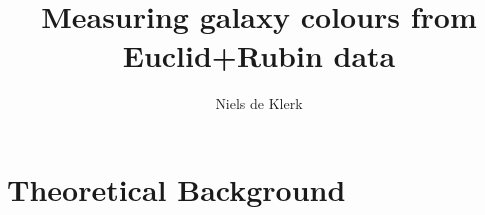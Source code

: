 \documentclass[oneside, single, authoryear, semicolon, 12pt]{lion-msc}
\title{Measuring galaxy colours from Euclid+Rubin data}
\author{Niels de Klerk}
\affiliation{Leiden Observatory, Universiteit Leiden}
\date{\displaydate{date}}
\newcommand{\4}{$_4$}
\newcommand{\3}{$_3$}
\newcommand{\2}{$_2$}
\begin{document}

\maketitle

\tableofcontents

\cleardoublepage




\chapter{Theoretical Background}\label{Ch: theory}

















\appendix
\end{document}
